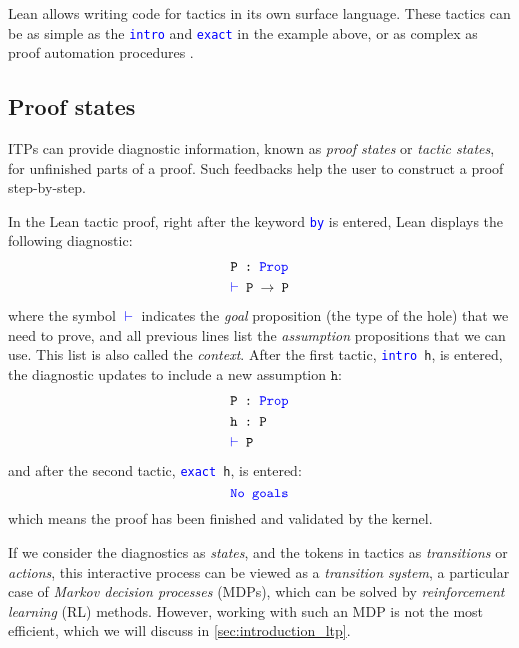 \documentclass[twoside]{report}
\begin{document}
\begin{itemize}
\begin{example}
    Lean allows writing code for tactics in its own surface language. These tactics can be as simple as the \texttt{\textcolor{blue}{intro}} and \texttt{\textcolor{blue}{exact}} in the example above, or as complex as proof automation procedures \cite{clune2024duper}.
    \end{example}
\end{itemize}

\subsection*{Proof states}

ITPs can provide diagnostic information, known as \emph{proof states} or \emph{tactic states}, for unfinished parts of a proof. Such feedbacks help the user to construct a proof step-by-step.

\begin{example}
In the Lean tactic proof, right after the keyword \texttt{\textcolor{blue}{by}} is entered, Lean displays the following diagnostic:
$$
\begin{aligned}
&\texttt{P :\ \textcolor{blue}{Prop}} \\
&\texttt{\textcolor{blue}{$\vdash$} P $\rightarrow$ P}
\end{aligned}
$$
where the symbol \textcolor{blue}{$\vdash$} indicates the \emph{goal} proposition (the type of the hole) that we need to prove, and all previous lines list the \emph{assumption} propositions that we can use. This list is also called the \emph{context}. After the first tactic, \texttt{\textcolor{blue}{intro} h}, is entered, the diagnostic updates to include a new assumption $\texttt{h}$:
$$
\begin{aligned}
&\texttt{P :\ \textcolor{blue}{Prop}} \\
&\texttt{h :\ P} \\
&\texttt{\textcolor{blue}{$\vdash$} P}
\end{aligned}
$$
and after the second tactic, \texttt{\textcolor{blue}{exact} h}, is entered:
$$
\texttt{\textcolor{blue}{No goals}}
$$
which means the proof has been finished and validated by the kernel.
\end{example}

If we consider the diagnostics as \emph{states}, and the tokens in tactics as \emph{transitions} or \emph{actions}, this interactive process can be viewed as a \emph{transition system}, a particular case of \emph{Markov decision processes} (MDPs), which can be solved by \emph{reinforcement learning} (RL) methods. However, working with such an MDP is not the most efficient, which we will discuss in \cref{sec:introduction_ltp}.
\end{document}
